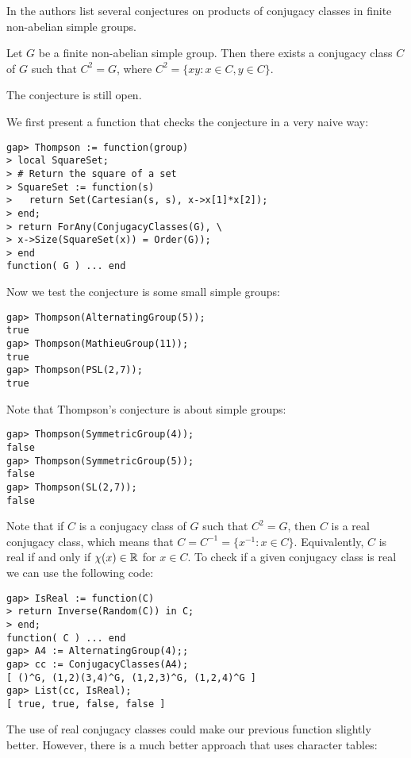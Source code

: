 In \cite{MR783067} the authors list several conjectures
on products of conjugacy classes in finite non-abelian simple groups. 

\begin{conjecture}[Thompson]
    Let $G$ be a finite non-abelian simple group. Then there
    exists a conjugacy class $C$ of $G$ such that 
    $C^2=G$, where 
    $C^2=\{xy:x\in C,y\in C\}$. 
\end{conjecture}

The conjecture is still open.

\begin{example}
    We first present a function that
    checks the conjecture in a very naive way:
\begin{lstlisting}
gap> Thompson := function(group)
> local SquareSet;
> # Return the square of a set
> SquareSet := function(s)
>   return Set(Cartesian(s, s), x->x[1]*x[2]);
> end;
> return ForAny(ConjugacyClasses(G), \ 
> x->Size(SquareSet(x)) = Order(G));
> end
function( G ) ... end
\end{lstlisting}
Now we test the conjecture is some small simple groups:
\begin{lstlisting}
gap> Thompson(AlternatingGroup(5));
true
gap> Thompson(MathieuGroup(11));
true
gap> Thompson(PSL(2,7));
true
\end{lstlisting}
Note that Thompson's conjecture is about simple 
groups: 
\begin{lstlisting}
gap> Thompson(SymmetricGroup(4));
false
gap> Thompson(SymmetricGroup(5));
false
gap> Thompson(SL(2,7));
false
\end{lstlisting}

    Note that if $C$ is a conjugacy class of $G$ such that 
    $C^2=G$, then $C$ is a real conjugacy class, which means that 
    $C=C^{-1}=\{x^{-1}:x\in C\}$. 
    Equivalently, $C$ is real if and only if $\chi(x)\in\mathbb{R}$ 
    for $x\in C$. To check if a given conjugacy class is real  
    we can use the following code: 
    
\begin{lstlisting}
gap> IsReal := function(C)
> return Inverse(Random(C)) in C;
> end;
function( C ) ... end
gap> A4 := AlternatingGroup(4);;
gap> cc := ConjugacyClasses(A4);
[ ()^G, (1,2)(3,4)^G, (1,2,3)^G, (1,2,4)^G ]
gap> List(cc, IsReal);
[ true, true, false, false ]
\end{lstlisting}

    The use of real conjugacy classes could make
    our previous function slightly better. However, 
    there is a much better approach that uses
    character tables: 


\end{example}
